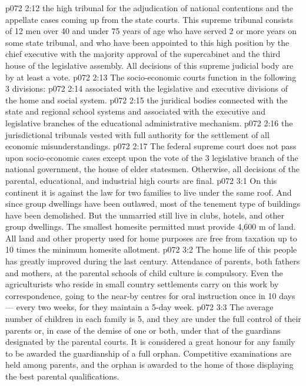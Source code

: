 \vs p072 2:12 \bibnobreakspace {} the high tribunal for the adjudication of national contentions and the appellate cases coming up from the state courts. This supreme tribunal consists of 12 men over 40 and under 75 years of age who have served 2 or more years on some state tribunal, and who have been appointed to this high position by the chief executive with the majority approval of the supercabinet and the third house of the legislative assembly. All decisions of this supreme judicial body are by at least a  vote.
\vs p072 2:13 \pc The socio\hyp{}economic courts function in the following 3 divisions:
\vs p072 2:14 \bibnobreakspace {} associated with the legislative and executive divisions of the home and social system.
\vs p072 2:15 \bibnobreakspace {} the juridical bodies connected with the state and regional school systems and associated with the executive and legislative branches of the educational administrative mechanism.
\vs p072 2:16 \bibnobreakspace {} the jurisdictional tribunals vested with full authority for the settlement of all economic misunderstandings.
\vs p072 2:17 \pc The federal supreme court does not pass upon socio\hyp{}economic cases except upon the  vote of the 3 legislative branch of the national government, the house of elder statesmen. Otherwise, all decisions of the parental, educational, and industrial high courts are final.
\vs p072 3:1 On this continent it is against the law for two families to live under the same roof. And since group dwellings have been outlawed, most of the tenement type of buildings have been demolished. But the unmarried still live in clubs, hotels, and other group dwellings. The smallest homesite permitted must provide 4,600 m of land. All land and other property used for home purposes are free from taxation up to 10 times the minimum homesite allotment.
\vs p072 3:2 The home life of this people has greatly improved during the last century. Attendance of parents, both fathers and mothers, at the parental schools of child culture is compulsory. Even the agriculturists who reside in small country settlements carry on this work by correspondence, going to the near\hyp{}by centres for oral instruction once in 10 days --- every two weeks, for they maintain a 5\hyp{}day week.
\vs p072 3:3 The average number of children in each family is 5, and they are under the full control of their parents or, in case of the demise of one or both, under that of the guardians designated by the parental courts. It is considered a great honour for any family to be awarded the guardianship of a full orphan. Competitive examinations are held among parents, and the orphan is awarded to the home of those displaying the best parental qualifications.
